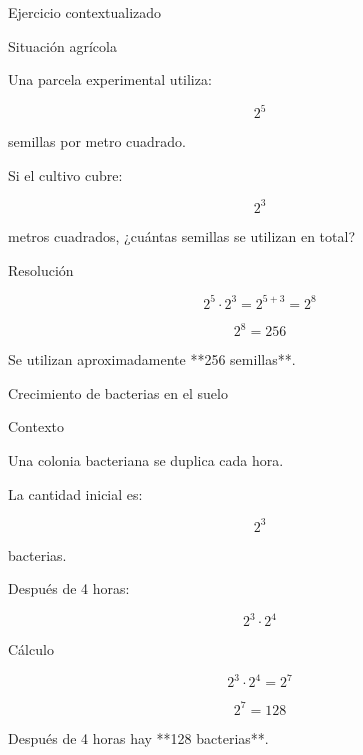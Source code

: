 \documentclass[aspectratio=169,10pt,handout]{beamer}
\begin{document}
	\begin{frame}{Ejercicio contextualizado}
		
		\begin{block}{Situación agrícola}
			
			Una parcela experimental utiliza:
			
			\[
			2^5
			\]
			
			semillas por metro cuadrado.
			
			Si el cultivo cubre:
			
			\[
			2^3
			\]
			
			metros cuadrados, ¿cuántas semillas se utilizan en total?
			
		\end{block}
		
		\pause
		
		\begin{exampleblock}{Resolución}
			
			\[
			2^5 \cdot 2^3 = 2^{5+3} = 2^8
			\]
			
			\[
			2^8 = 256
			\]
			
			Se utilizan aproximadamente **256 semillas**.
			
		\end{exampleblock}
		
	\end{frame}
	
	\begin{frame}{Crecimiento de bacterias en el suelo}
		
		\begin{block}{Contexto}
			
			Una colonia bacteriana se duplica cada hora.
			
			La cantidad inicial es:
			
			\[
			2^3
			\]
			
			bacterias.
			
			Después de 4 horas:
			
			\[
			2^3 \cdot 2^4
			\]
			
		\end{block}
		
		\pause
		
		\begin{exampleblock}{Cálculo}
			
			\[
			2^3 \cdot 2^4 = 2^{7}
			\]
			
			\[
			2^7 = 128
			\]
			
			Después de 4 horas hay **128 bacterias**.
			
		\end{exampleblock}
		
	\end{frame}
	
\end{document}
